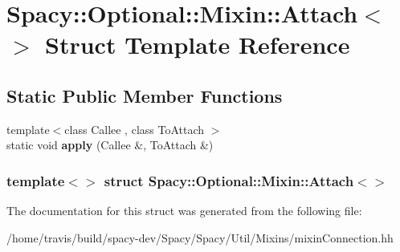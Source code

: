 \hypertarget{structSpacy_1_1Optional_1_1Mixin_1_1Attach_3_4}{\section{\-Spacy\-:\-:\-Optional\-:\-:\-Mixin\-:\-:\-Attach$<$$>$ \-Struct \-Template \-Reference}
\label{structSpacy_1_1Optional_1_1Mixin_1_1Attach_3_4}
}
\subsection*{\-Static \-Public \-Member \-Functions}
\begin{DoxyCompactItemize}
\item 
\hypertarget{structSpacy_1_1Optional_1_1Mixin_1_1Attach_3_4_ae78568d36f4b9ee4ece2c501880fc894}{{\footnotesize template$<$class Callee , class To\-Attach $>$ }\\static void {\bfseries apply} (\-Callee \&, \-To\-Attach \&)}\label{structSpacy_1_1Optional_1_1Mixin_1_1Attach_3_4_ae78568d36f4b9ee4ece2c501880fc894}

\end{DoxyCompactItemize}
\subsubsection*{template$<$$>$ struct Spacy\-::\-Optional\-::\-Mixin\-::\-Attach$<$$>$}



\-The documentation for this struct was generated from the following file\-:\begin{DoxyCompactItemize}
\item 
/home/travis/build/spacy-\/dev/\-Spacy/\-Spacy/\-Util/\-Mixins/mixin\-Connection.\-hh\end{DoxyCompactItemize}
